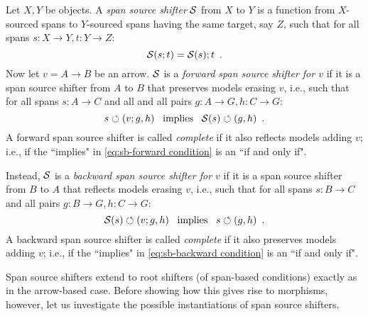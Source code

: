 \begin{definition}
Let $X,Y$ be objects. A \emph{span source shifter} $\mathcal{S}$ from $X$ to $Y$ is a function from $X$-sourced spans to $Y$-sourced spans having the same target, say $Z$, such that for all spans $s:X\to Y,t:Y\to Z$:
%
\begin{equation}\eqlabel{span shifters are functors}
\cS(s;t) = \cS(s);t \enspace.
\end{equation}
%
Now let $v=A\to B$ be an arrow. $\mathcal{S}$ is a \emph{forward span source shifter for $v$} if it is a span source shifter from $A$ to $B$ that preserves models erasing $v$, i.e., such that for all spans $s:A\to C$ and all and all pairs $g:A\to G,h:C \to G$:
%
\begin{equation}\eqlabel{sb-forward condition}
s\commutes (v;g,h) \enspace\text{ implies }\enspace \cS(s) \commutes (g,h) \enspace.
\end{equation}
%
A forward span source shifter is called \emph{complete} if it also reflects models adding $v$; i.e., if the ``implies" in \eqref{eq:sb-forward condition} is an ``if and only if".

Instead, $\mathcal{S}$ is a \emph{backward span source shifter for $v$} if it is a span source shifter from $B$ to $A$ that reflects models erasing $v$, i.e., such that for all spans $s:B\to C$ and all pairs $g:B\to G,h:C\to G$:
%
\begin{equation}\eqlabel{sb-backward condition}
\cS(s) \commutes (v;g,h) \enspace\text{ implies }\enspace s\commutes (g,h) \enspace.
\end{equation}
%
A backward span source shifter is called \emph{complete} if it also preserves models adding $v$; i.e., if the ``implies" in \eqref{eq:sb-backward condition} is an ``if and only if".
\end{definition}
%
Span source shifters extend to root shifters (of span-based conditions) exactly as in the arrow-based case. Before showing how this gives rise to morphisms, however, let us investigate the possible instantiations of span source shifters.

